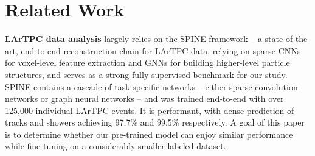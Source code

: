\section{Related Work}
\textbf{LArTPC data analysis} largely relies on the \textsc{SPINE} framework \cite{drielsma2021scalableendtoenddeeplearningbaseddata} -- a state-of-the-art, end-to-end reconstruction chain for LArTPC data, relying on sparse CNNs for voxel-level feature extraction and GNNs for building higher-level particle structures, and serves as a strong fully-supervised benchmark for our study. \textsc{SPINE} contains a cascade of task-specific networks -- either sparse convolution networks or graph neural networks -- and was trained end-to-end with over 125,000 individual LArTPC events. It is performant, with dense prediction of tracks and showers achieving 97.7\% and 99.5\% respectively. A goal of this paper is to determine whether our pre-trained model can enjoy similar performance while fine-tuning on a considerably smaller labeled dataset.


